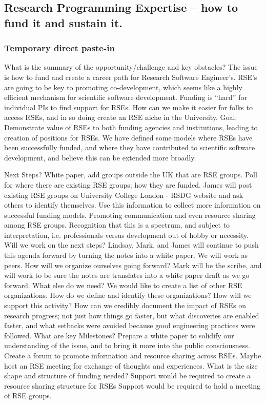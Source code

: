 \subsection{Research Programming Expertise -- how to fund it and sustain it.}



\subsubsection{Temporary direct paste-in}

What is the summary of the opportunity/challenge and key obstacles?
The issue is how to fund and create a career path for Research Software Engineer’s. RSE’s are going to be key to promoting co-development, which seems like a highly efficient mechanism for scientific software development.
Funding is “hard” for individual PIs to find support for RSEs. How can we make it easier for folks to access RSEs, and in so doing create an RSE niche in the University.
Goal: Demonstrate value of RSEs to both funding agencies and institutions, leading to creation of positions for RSEs.
 We have defined some models where RSEs have been successfully funded, and where they have contributed to scientific software development, and believe this can be extended more broadly.

Next Steps?
White paper, add groups outside the UK that are RSE groups.
Poll for where there are existing RSE groups; how they are funded. James will post existing RSE groups on University College London - RSDG website and ask others to identify themselves. Use this information to collect more information on successful funding models.
Promoting communication and even resource sharing among RSE groups.
Recognition that this is a spectrum, and subject to interpretation, i.e. professionals versus development out of hobby or necessity.
Will we work on the next steps?
Lindsay, Mark, and James will continue to push this agenda forward by turning the notes into a white paper. We will work as peers.
How will we organize ourselves going forward?
Mark will be the scribe, and will work to be sure the notes are translates into a white paper draft as we go forward.
What else do we need?
We would like to create a list of other RSE organizations. How do we define and identify these organizations? How will we support this activity?
How can we credibly document the impact of RSEs on research progress; not just how things go faster, but what discoveries are enabled faster, and what setbacks were avoided because good engineering practices were followed.
What are key Milestones?
Prepare a white paper to solidify our understanding of the issue, and to bring it more into the public consciousness.
Create a forum to promote information and resource sharing across RSEs.
Maybe host an RSE meeting for exchange of thoughts and experiences.
What is the size shape and structure of funding needed?
Support would be required to create a resource sharing structure for RSEs
Support would be required to hold a meeting of RSE groups.



